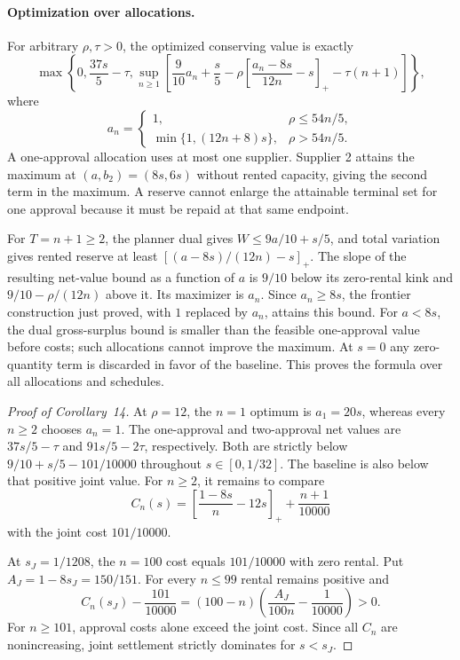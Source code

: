 \documentclass[ecta,draft,supplement]{econsocart}
\theoremstyle{definition}
\theoremstyle{definition}
\begin{document}
\begin{appendix}
\paragraph{Optimization over allocations.}
For arbitrary $\rho,\tau>0$, the optimized conserving value is
exactly
\[
 \max\left\{0,\frac{37s}{5}-\tau,
 \sup_{n\geq1}\left[
 \frac9{10}a_n+\frac s5
 -\rho\left[\frac{a_n-8s}{12n}-s\right]_+
 -\tau(n+1)\right]\right\},
\]
where
\[
 a_n=
 \begin{cases}
 1,&\rho\leq54n/5,\\
 \min\{1,(12n+8)s\},&\rho>54n/5.
 \end{cases}
\]
A one-approval allocation uses at most one supplier. Supplier 2
attains the maximum at $(a,b_2)=(8s,6s)$ without rented capacity,
giving the second term in the maximum. A reserve cannot enlarge
the attainable terminal set for one approval because it must
be repaid at that same endpoint.

For $T=n+1\geq2$, the planner dual gives
$W\leq9a/10+s/5$, and total variation gives rented reserve
at least $[(a-8s)/(12n)-s]_+$. The slope of the resulting
net-value bound as a function of $a$ is $9/10$ below its
zero-rental kink and $9/10-\rho/(12n)$ above it. Its maximizer
is $a_n$. Since $a_n\geq8s$, the frontier construction just
proved, with $1$ replaced by $a_n$, attains this bound.
For $a<8s$, the dual gross-surplus bound is smaller than the
feasible one-approval value before costs; such allocations
cannot improve the maximum. At $s=0$ any zero-quantity term
is discarded in favor of the baseline. This proves the formula
over all allocations and schedules.

\begin{proof}[Proof of Corollary~14%
]
At $\rho=12$, the $n=1$ optimum is $a_1=20s$, whereas
every $n\geq2$ chooses $a_n=1$. The one-approval and
two-approval net values are $37s/5-\tau$ and
$91s/5-2\tau$, respectively. Both are strictly below
$9/10+s/5-101/10000$ throughout $s\in[0,1/32]$.
The baseline is also below that positive joint value.
For $n\geq2$, it remains to compare
\[
 C_n(s)=\left[\frac{1-8s}{n}-12s\right]_+
       +\frac{n+1}{10000}
\]
with the joint cost $101/10000$.

At $s_J=1/1208$, the $n=100$ cost equals $101/10000$
with zero rental. Put $A_J=1-8s_J=150/151$.
For every $n\leq99$ rental remains positive and
\[
 C_n(s_J)-\frac{101}{10000}
 =(100-n)\left(\frac{A_J}{100n}-\frac1{10000}\right)>0.
\]
For $n\geq101$, approval costs alone exceed the joint cost.
Since all $C_n$ are nonincreasing, joint settlement strictly
dominates for $s<s_J$.


\end{proof}
\end{appendix}
\end{document}
